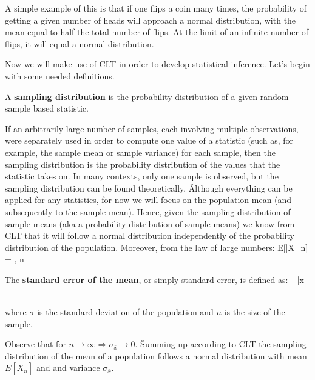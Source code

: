 \be
A simple example of this is that if one flips a coin many times, the probability of getting a given number of heads
will approach a normal distribution, with the mean equal to half the total number of flips. At the limit of an
infinite number of flips, it will equal a normal distribution.
\ee

Now we will make use of CLT in order to develop statistical inference. Let's begin with some needed definitions.

A \textbf{sampling distribution} is the probability distribution of a given random sample based statistic.
\ed

If an arbitrarily large number of samples, each involving multiple observations, were separately used in order to
compute one value of a statistic (such as, for example, the sample mean or sample variance) for each sample, then
the sampling distribution is the probability distribution of the values that the statistic takes on. In many
contexts, only one sample is observed, but the sampling distribution can be found theoretically. \v

Although everything can be applied for any statistics, for now we will focus on the population mean (and
subsequently to the sample mean). Hence, given the sampling distribution of sample means (aka a probability
distribution of sample means) we know from CLT that it will follow a normal distribution independently of the
probability distribution of the population. Moreover, from the law of large numbers:
\bse
E[\bar{X}_{n}] = \mu, \quad {} n \to \infty
\ese

The \textbf{standard error of the mean}, or simply standard error, is defined as:
\bse
\sigma_{\bar {x}} = 
\ese

where $\sigma$ is the standard deviation of the population and $n$ is the size of the sample.
\ed

Observe that for $n \to \infty \Rightarrow \sigma_{\bar {x}} \to 0$. \v

Summing up according to CLT the sampling distribution of the mean of a population follows a normal distribution with
mean $E[\bar{X}_{n}]$ and and variance $\sigma_{\bar {x}}$.

